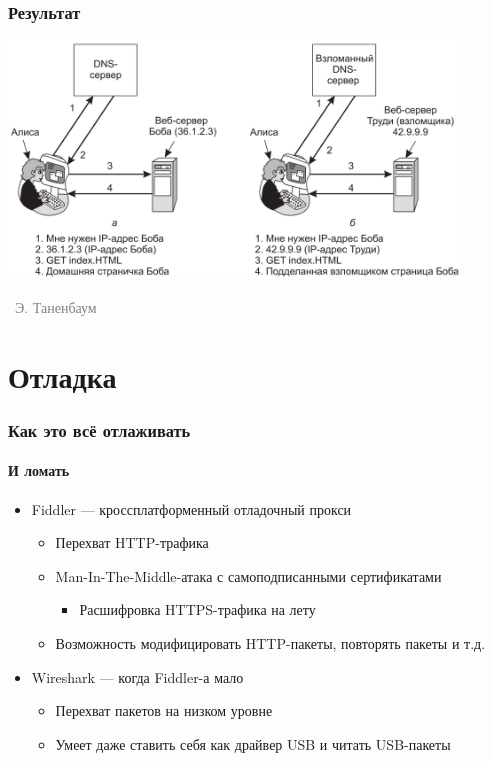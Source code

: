 \documentclass[xetex,mathserif,serif]{beamer}
\newcommand{\attribution}[1] {
\vspace{-5mm}\begin{flushright}\begin{scriptsize}\textcolor{gray}{\textcopyright\, #1}\end{scriptsize}\end{flushright}
}
\begin{document}
    \begin{frame}
        \frametitle{Результат}
        \begin{center}
            \includegraphics[width=0.9\textwidth]{dnsSpoofingResult.png}
            \attribution{Э. Таненбаум}
        \end{center}
    \end{frame}

    \section{Отладка}

    \begin{frame}
        \frametitle{Как это всё отлаживать}
        \framesubtitle{И ломать}
        \begin{itemize}
            \item Fiddler --- кроссплатформенный отладочный прокси
            \begin{itemize}
                \item Перехват HTTP-трафика
                \item Man-In-The-Middle-атака с самоподписанными сертификатами
                \begin{itemize}
                    \item Расшифровка HTTPS-трафика на лету
                \end{itemize}
                \item Возможность модифицировать HTTP-пакеты, повторять пакеты и т.д.
            \end{itemize}
            \item Wireshark --- когда Fiddler-а мало
            \begin{itemize}
                \item Перехват пакетов на низком уровне
                \item Умеет даже ставить себя как драйвер USB и читать USB-пакеты
            \end{itemize}
        \end{itemize}
    \end{frame}
\end{document}
